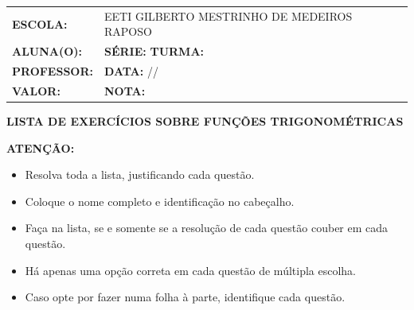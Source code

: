 \documentclass[12pt]{article}
\begin{document}
\thispagestyle{empty}
\vspace{0.5cm}
\begin{center}
	\large
	\begin{tabular}{|l l|}
		\hline
		\textbf{ESCOLA:} & EETI GILBERTO MESTRINHO DE MEDEIROS RAPOSO \\ 
		\textbf{ALUNA(O):} & \underline{\hspace{7cm}} \textbf{SÉRIE:} \underline{\hspace{1.5cm}} \textbf{TURMA:} \underline{\hspace{1.5cm}} \\
		\textbf{PROFESSOR:} & \underline{\hspace{7cm}} \textbf{DATA:} \underline{\hspace{1.5cm}}/\underline{\hspace{1.5cm}}/\underline{\hspace{1.5cm}} \\
		\textbf{VALOR:} & \underline{\hspace{3cm}} \textbf{NOTA:} \underline{\hspace{1.5cm}} \\
		\hline
	\end{tabular}
\end{center}
\vspace{0.5cm}

\vspace{0.4cm}

\begin{center}
\Large \textbf{LISTA DE EXERCÍCIOS SOBRE FUNÇÕES TRIGONOMÉTRICAS}
\end{center}

\vspace{0.2cm}

\textbf{ATENÇÃO:}
\begin{itemize}
    \item Resolva toda a lista, justificando cada questão.
    \item Coloque o nome completo e identificação no cabeçalho.
    \item Faça na lista, se e somente se a resolução de cada questão couber em cada questão.
    \item Há apenas uma opção correta em cada questão de múltipla escolha.
    \item Caso opte por fazer numa folha à parte, identifique cada questão.
\end{itemize}

\vspace{0.4cm}
\end{document}
